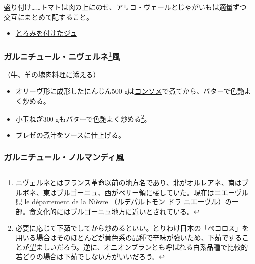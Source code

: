 \begin{recette}
盛り付け\ldots{}\ldots{}トマトは肉の上にのせ、アリコ・ヴェールとじゃがいもは適量ずつ交互にまとめて配すること。

\begin{itemize}
\tightlist
\item
  \protect\hyperlink{jus-de-veau-lie}{とろみを付けたジュ}
\end{itemize}

\hypertarget{garniture-a-la-nivernaise}{%
\subsubsection[ガルニチュール・ニヴェルネ風]{\texorpdfstring{ガルニチュール・ニヴェルネ\footnote{ニヴェルネとはフランス革命以前の地方名であり、北がオルレアネ、南はブルボネ、東はブルゴーニュ、西がベリー領に椄していた。現在はニエーヴル県
  le département de la Nièvre （ルデパルトモン ドラ
  ニエーヴル）の一部。食文化的にはブルゴーニュ地方に近いとされている。}風}{ガルニチュール・ニヴェルネ風}}\label{garniture-a-la-nivernaise}}



（牛、羊の塊肉料理に添える）

\begin{itemize}
\item
  オリーヴ形に成形したにんじん500
  gは\protect\hyperlink{consomme-blanc-simple}{コンソメ}で煮てから、バターで色艶よく炒める。
\item
  小玉ねぎ300 gもバターで色艶よく炒める\footnote{必要に応じて下茹でしてから炒めるといい。とりわけ日本の「ペコロス」を用いる場合はそのほとんどが黄色系の品種で辛味が強いため、下茹ですることが望ましいだろう。逆に、オニオンブランとも呼ばれる白系品種で比較的若どりの場合は下茹でしない方がいいだろう。}。
\item
  ブレゼの煮汁をソースに仕上げる。
\end{itemize}

\hypertarget{garniture-a-la-normande}{%
\subsubsection{ガルニチュール・ノルマンディ風}\label{garniture-a-la-normande}}


\end{recette}
